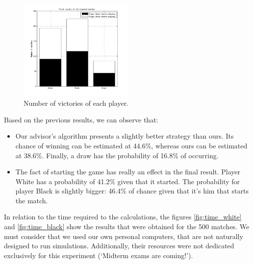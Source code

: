 \begin{figure}
  \vspace{-40pt}
  \begin{center}
    \includegraphics[width=0.50\textwidth]{images/victories_count}
  \end{center}
  \vspace{-20pt}
  \caption{Number of victories of each player.}
  \vspace{-30pt}
  \label{fig:hist}
\end{figure} 
\vspace{10pt}

Based on the previous results, we can observe that:

\begin{itemize}
  \item Our advisor’s algorithm presents a slightly better strategy than ours.
  Its chance of winning can be estimated at 44.6\%, whereas ours can be
  estimated at 38.6\%. Finally, a draw has the probability of 16.8\% of
  occurring.
  \item  The fact of starting the game has really an effect in the final result.
  Player White has a probability of 41.2\% given that it started. The
  probability for player Black is slightly bigger: 46.4\% of chance given that
  it’s him that starts the match.
\end{itemize}

In relation to the time required to the calculations, the figures
\ref{fig:time_white} and \ref{fig:time_black} show the results that were
obtained for the 500 matches. We must consider that we used our own personal
computers, that are not naturally designed to run simulations. Additionally,
their resources were not dedicated exclusively for this experiment (‘Midterm
exams are coming!’).


